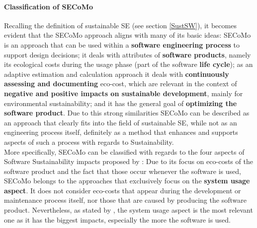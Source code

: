 \documentclass[oribibl]{llncs}
\begin{document}
\paragraph{Classification of SECoMo}
Recalling the definition of sustainable SE (see section \ref{SustSW}), it becomes evident that the SECoMo approach aligns with many of its basic ideas: SECoMo is an approach that can be used within a \textbf{software engineering process} to support design decisions; it deals with attributes of \textbf{software products}, namely its ecological costs during the usage phase (part of the software \textbf{life cycle}); as an adaptive estimation and calculation approach it deals with \textbf{continuously assessing and documenting} eco-cost, which are relevant in the context of \textbf{negative and positive impacts on sustainable development}, mainly for environmental sustainability; and it has the general goal of \textbf{optimizing the software product}. Due to this strong similarities SECoMo can be described as an approach that clearly fits into the field of sustainable SE, while not as an engineering process itself, definitely as a method that enhances and supports aspects of such a process with regards to Sustainability.\\
More specifically, SECoMo can be classified with regards to the four aspects of Software Sustainability impacts proposed by \cite{penzenstadler_supporting_2012}: Due to its focus on eco-costs of the software product and the fact that those occur whenever the software is used, SECoMo belongs to the approaches that exclusively focus on the \textbf{system usage aspect}. It does not consider eco-costs that appear during the development or maintenance process itself, nor those that are caused by producing the software product. Nevertheless, as stated by \cite{penzenstadler_what_13}, the system usage aspect is the most relevant one as it has the biggest impacts, especially the more the software is used. %
\end{document}
